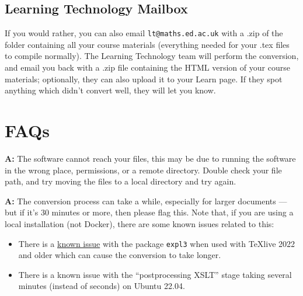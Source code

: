 \subsection{Learning Technology Mailbox}
\label{ssec:lt}

If you would rather, you can also email \verb|lt@maths.ed.ac.uk| with a .zip of the folder containing all your course materials (everything needed for your .tex files to compile normally). The Learning Technology team will perform the conversion, and email you back with a .zip file containing the HTML version of your course materials; optionally, they can also upload it to your Learn page. If they spot anything which didn't convert well, they will let you know.


\section{FAQs}
\label{sec:FAQ}


\begin{description}[style=nextline]
\item[Q: Error: \texttt{Warning: no .tex files with \textbackslash{}documentclass found in this directory}]

\textbf{A:} The software cannot reach your files, this may be due to running the software in the wrong place, permissions, or a remote directory. 
Double check your file path, and try moving the files to a local directory and try again.

\item[Q: The conversion process is taking a very long time.]

\textbf{A:} The conversion process can take a while, especially for larger documents --- but if it's 30 minutes or more, then please flag this. Note that, if you are using a local installation (not Docker), there are some known issues related to this:
    \begin{itemize}
        \item There is a \href{https://github.com/brucemiller/LaTeXML/issues/2268}{known issue} with the package \verb|expl3| when used with TeXlive 2022 and older which can cause the conversion to take longer.
        \item There is a known issue with the ``postprocessing XSLT'' stage taking several minutes (instead of seconds) on Ubuntu 22.04.
    \end{itemize}

\end{description}
 
